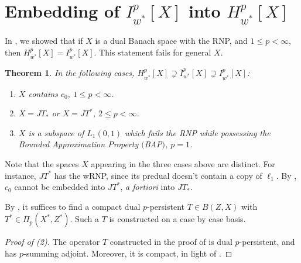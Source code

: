 \documentclass{amsart}
\theoremstyle{plain}
\newtheorem{theorem}{Theorem}[section]
\theoremstyle{definition}
\numberwithin{equation}{section}
\newcommand{\vr}{\varepsilon}
\newcommand{\Hp}{H_{w^*}^{p}}
\newcommand{\nip}{I_{w^*}^{p}}
\newcommand{\Ip}{\overline{I}_{w^*}^{p}}
\begin{document}

\section{Embedding of $\nip[X]$ into $\Hp[X]$}\label{FBLp vs Ip vs Hp}\label{Ip into Hp}
In , we showed that if $X$ is a dual Banach space with the RNP, and $1 \leq p < \infty$, then $\Hp[X] = \nip[X]$. This statement fails for general $X$.


\begin{theorem}\label{Ip not HP}
In the following cases, $\Hp[X] \supsetneq \Ip[X] \supsetneq \nip[X]$:
\begin{enumerate}
    \item $X$ contains $c_0$, $1 \leq p < \infty$.
    \item $X = JT_*$ or $X = JT^*$, $2 \leq p < \infty$.
    \item $X$ is a subspace of $L_1(0,1)$ which fails the RNP while possessing the Bounded Approximation Property $($BAP$)$, $p=1$.
\end{enumerate}
\end{theorem}

Note that the spaces $X$ appearing in the three cases above are distinct. For instance, $JT^*$ has the wRNP, since its predual doesn't contain a copy of $\ell_1$. By \cite[Theorem 7.4.8]{Bour}, $c_0$ cannot be embedded into $JT^*$, \emph{a fortiori} into $JT_*$.

By , it suffices to find a compact dual $p$-persistent $T \in B(Z,X)$ with $T^* \in \Pi_p(X^*,Z^*)$. Such a $T$ is constructed on a case by case basis.

\begin{proof}[Proof of (2)]
The operator $T$ constructed in the proof of  is dual $p$-persistent, and has $p$-summing adjoint. Moreover, it is compact, in light of .
\end{proof}
\end{document}
